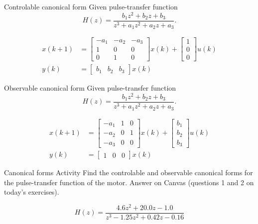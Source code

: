 \documentclass[presentation,aspectratio=1610]{beamer}
\begin{document}
\begin{frame}[label={sec:org7513c03}]{Controlable canonical form}
Given pulse-transfer function 
\[ H(z) = \frac{b_1 z^2 + b_2 z + b_3}{z^3 + a_1z^2 + a_2z + a_3}.\] 

\begin{align*}
 x(k+1) &= \begin{bmatrix} -a_1 & -a_2 & -a_3\\1 & 0 & 0\\0 & 1 & 0\end{bmatrix} x(k) + \begin{bmatrix}1\\0\\0\end{bmatrix} u(k) \\
 y(k) &= \begin{bmatrix} b_1 & b_2 & b_3 \end{bmatrix} x(k)
 \end{align*}
\end{frame}


\begin{frame}[label={sec:org2bef48e}]{Observable canonical form}
Given pulse-transfer function 
\[ H(z) = \frac{b_1 z^2 + b_2 z + b_3}{z^3 + a_1z^2 + a_2z + a_3}.\] 

\begin{align*}
 x(k+1) &= \begin{bmatrix} -a_1 & 1 & 0\\-a_2 & 0 & 1\\-a_3 & 0 & 0\end{bmatrix} x(k) + \begin{bmatrix}b_1\\b_2\\b_3\end{bmatrix} u(k) \\
 y(k) &= \begin{bmatrix} 1 & 0 & 0 \end{bmatrix} x(k)
 \end{align*}
\end{frame}


\begin{frame}[label={sec:org982ed49}]{Canonical forms}
\alert{Activity} Find the controlable and observable canonical forms for the pulse-transfer function of the motor. Answer on Canvas (questions 1 and 2 on today's exercises).

\[ H(z) = \frac{4.6z^2 + 20.0z -1.0}{z^3 - 1.25z^2 + 0.42z - 0.16}\]
\end{frame}
\end{document}
